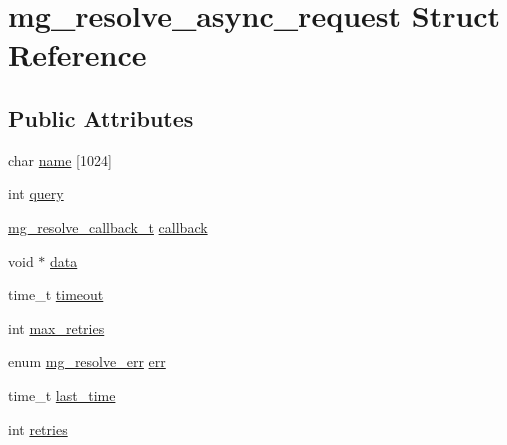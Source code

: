 \hypertarget{structmg__resolve__async__request}{}\section{mg\+\_\+resolve\+\_\+async\+\_\+request Struct Reference}
\label{structmg__resolve__async__request}
\subsection*{Public Attributes}
\begin{DoxyCompactItemize}
\item 
char \hyperlink{structmg__resolve__async__request_a3d5bd5daeb6672a070322e3cf304eb75_a3d5bd5daeb6672a070322e3cf304eb75}{name} \mbox{[}1024\mbox{]}
\item 
int \hyperlink{structmg__resolve__async__request_aa7f0cbfc40e85f445d117e5804825dbe_aa7f0cbfc40e85f445d117e5804825dbe}{query}
\item 
\hyperlink{mongoose_8h_acb5c96f1b5d26b71d4b397fc2b2fda54_acb5c96f1b5d26b71d4b397fc2b2fda54}{mg\+\_\+resolve\+\_\+callback\+\_\+t} \hyperlink{structmg__resolve__async__request_ae07665c233e6a23b2e87075e325b0cab_ae07665c233e6a23b2e87075e325b0cab}{callback}
\item 
void $\ast$ \hyperlink{structmg__resolve__async__request_aebb9fce193633d8f2112077ad1b39078_aebb9fce193633d8f2112077ad1b39078}{data}
\item 
time\+\_\+t \hyperlink{structmg__resolve__async__request_a591efe1d1186694f5a4e91a09c60ec89_a591efe1d1186694f5a4e91a09c60ec89}{timeout}
\item 
int \hyperlink{structmg__resolve__async__request_a0586dade9fff37fd19ee9967cf121536_a0586dade9fff37fd19ee9967cf121536}{max\+\_\+retries}
\item 
enum \hyperlink{mongoose_8h_a4c4b4acce406523462d38e0a0862dfb9_a4c4b4acce406523462d38e0a0862dfb9}{mg\+\_\+resolve\+\_\+err} \hyperlink{structmg__resolve__async__request_a237f8c5e8a05698a7206dc0098d206f9_a237f8c5e8a05698a7206dc0098d206f9}{err}
\item 
time\+\_\+t \hyperlink{structmg__resolve__async__request_a8ad1cbe9e2408b224d83e3d43e8e8275_a8ad1cbe9e2408b224d83e3d43e8e8275}{last\+\_\+time}
\item 
int \hyperlink{structmg__resolve__async__request_a64cca6891e31a194feb970363f14cd52_a64cca6891e31a194feb970363f14cd52}{retries}
\end{DoxyCompactItemize}



